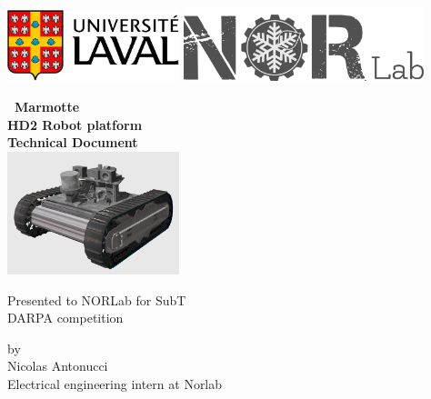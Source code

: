 \thispagestyle{empty}	%
\includegraphics[width=5cm]{figures/logoUlaval.jpg}	%
\hspace{4.5cm}
\includegraphics[width=7cm]{figures/norlab_logo_acronym_dark.png}
\vspace{1cm}	%

\begin{center}	%
{\huge \textbf{\ Marmotte \\ HD2 Robot platform \\ Technical Document}}\\ %
\large
\vspace{1cm}
\includegraphics[width=5cm]{figures/marmotteCAD1.png}
\vspace{1cm}

Presented to NORLab for SubT \\ DARPA competition


\vspace{4cm}
by \\ 
Nicolas Antonucci \\
Electrical engineering intern at Norlab

\vfill	%

{}

\pagebreak
\end{center}